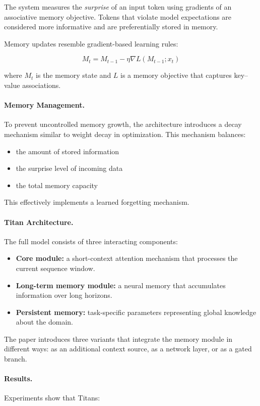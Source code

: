 \documentclass[12pt]{article}
\begin{document}
The system measures the \emph{surprise} of an input token using gradients of an associative memory objective.
Tokens that violate model expectations are considered more informative and are preferentially stored
in memory.

Memory updates resemble gradient-based learning rules:

\[
		M_t = M_{t-1} - \eta \nabla L(M_{t-1}; x_t)
\]

where $M_t$ is the memory state and $L$ is a memory objective that captures key–value associations.

\paragraph{Memory Management.}
To prevent uncontrolled memory growth, the architecture introduces a decay mechanism similar to weight
decay in optimization. This mechanism balances:

\begin{itemize}
		\item the amount of stored information
		\item the surprise level of incoming data
		\item the total memory capacity
\end{itemize}

This effectively implements a learned forgetting mechanism.

\paragraph{Titan Architecture.}
The full model consists of three interacting components:

\begin{itemize}
		\item \textbf{Core module:} a short-context attention mechanism that processes the current sequence window.
		\item \textbf{Long-term memory module:} a neural memory that accumulates information over long horizons.
		\item \textbf{Persistent memory:} task-specific parameters representing global knowledge about the domain.
\end{itemize}

The paper introduces three variants that integrate the memory module in different ways:
as an additional context source, as a network layer, or as a gated branch.

\paragraph{Results.}
Experiments show that Titans:
\end{document}
